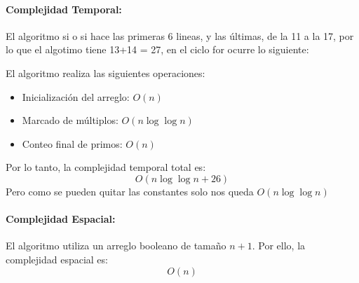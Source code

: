 \paragraph{Complejidad Temporal:}
El algoritmo si o si hace las primeras 6 lineas, y las últimas, de la 11 a la 17, por lo que el algotimo tiene 13+14 = 27, en el ciclo for ocurre lo siguiente:

El algoritmo realiza las siguientes operaciones:
\begin{itemize}
    \item Inicialización del arreglo: $O(n)$
    \item Marcado de múltiplos: $O(n \log \log n)$
    \item Conteo final de primos: $O(n)$
\end{itemize}
Por lo tanto, la complejidad temporal total es:
\[
O(n \log \log n + 26)
\]
Pero como se pueden quitar las constantes solo nos queda $O(n \log \log n)$

\paragraph{Complejidad Espacial:}
El algoritmo utiliza un arreglo booleano de tamaño $n+1$. Por ello, la complejidad espacial es:
\[
O(n)
\] 
